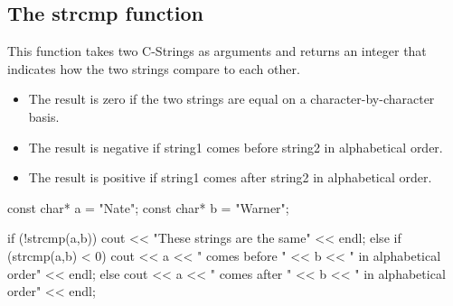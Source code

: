 \documentclass{report}
\begin{document}
    \pagebreak
    \subsection{The strcmp function}
    \bigbreak \noindent 
    This function takes two C-Strings as arguments and returns an integer that indicates how the two strings compare to each other. 
    \begin{itemize}
        \item The result is zero if the two strings are equal on a character-by-character basis.
        \item The result is negative if string1 comes before string2 in alphabetical order.
        \item The result is positive if string1 comes after string2 in alphabetical order.
    \end{itemize}
    \bigbreak \noindent 
    
    \begin{cppcode}
const char* a = "Nate";
const char* b = "Warner";

if (!strcmp(a,b)) {
    cout << "These strings are the same" << endl;
} else if (strcmp(a,b) < 0) {
    cout << a << " comes before " << b << " in alphabetical order" << endl;
} else {
    cout << a << " comes after " << b << " in alphabetical order" << endl;
}
    \end{cppcode}
    

    \bigbreak \noindent 
\end{document}
